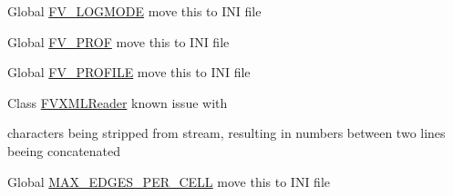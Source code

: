 \label{dd/da0/todo__todo000007}
\hypertarget{dd/da0/todo__todo000007}{}
 
\begin{DoxyDescription}
\item[Global \hyperlink{FVMacros_8h_a3842a67534e67416db38f6c2b0b30de9}{FV\_\-LOGMODE} ]move this to INI file 
\end{DoxyDescription}

\label{dd/da0/todo__todo000012}
\hypertarget{dd/da0/todo__todo000012}{}
 
\begin{DoxyDescription}
\item[Global \hyperlink{FVMacros_8h_a8f8d5794d3b6ec9edd4b36ea35980b4c}{FV\_\-PROF} ]move this to INI file 
\end{DoxyDescription}

\label{dd/da0/todo__todo000010}
\hypertarget{dd/da0/todo__todo000010}{}
 
\begin{DoxyDescription}
\item[Global \hyperlink{FVMacros_8h_a01a46e0ca0f53aa931f43f1a18b8056f}{FV\_\-PROFILE} ]move this to INI file 
\end{DoxyDescription}

\label{dd/da0/todo__todo000013}
\hypertarget{dd/da0/todo__todo000013}{}
 
\begin{DoxyDescription}
\item[Class \hyperlink{classFVL_1_1FVXMLReader}{FVXMLReader} ]known issue with \par
 characters being stripped from stream, resulting in numbers between two lines beeing concatenated 
\end{DoxyDescription}

\label{dd/da0/todo__todo000005}
\hypertarget{dd/da0/todo__todo000005}{}
 
\begin{DoxyDescription}
\item[Global \hyperlink{FVMacros_8h_a30fb97283ac31016acd1bc1dad728480}{MAX\_\-EDGES\_\-PER\_\-CELL} ]move this to INI file 
\end{DoxyDescription}